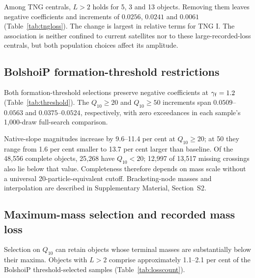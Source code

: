 \documentclass[11pt,a4paper]{article}
\begin{document}
Among TNG centrals, $L>2$ holds for 5, 3 and 13 objects. Removing them leaves negative coefficients and increments of $0.0256$, $0.0241$ and $0.0061$ (Table~\ref{tab:tngloss}). The change is largest in relative terms for TNG I. The association is neither confined to current satellites nor to these large-recorded-loss centrals, but both population choices affect its amplitude.
\begin{table}[htbp]\centering\small

\caption{Additional descriptive TNG central-only fits with $L\leq2$, at the fiducial parameter. Counts removed are relative to the central sample. No new permutation probabilities are assigned to these three populations. Control ranks remain $k_C=16,16,15$ for TNG I--III, excluding the history coefficient.}\label{tab:tngloss}
\end{table}

\subsection{BolshoiP formation-threshold restrictions}
Both formation-threshold selections preserve negative coefficients at $\gamma_{\rm f}=1.2$ (Table~\ref{tab:threshold}). The $Q_{10}\geq20$ and $Q_{10}\geq50$ increments span $0.0509$--$0.0563$ and $0.0375$--$0.0524$, respectively, with zero exceedances in each sample's 1,000-draw full-search comparison.

\begin{table}[htbp]\centering\small

\caption{BolshoiP threshold sensitivities at $\gamma_{\rm f}=1.2$. Errors are conventional OLS values; $b$ is the slope in catalogue units. Baseline and both cuts have zero of 1,000 joint-null exceedances. Each restricted null is generated on its own rows.}\label{tab:threshold}
\end{table}

Native-slope magnitudes increase by 9.6--11.4 per cent at $Q_{10}\geq20$; at 50 they range from 1.6 per cent smaller to 13.7 per cent larger than baseline. Of the 48,556 complete objects, 25,268 have $Q_{10}<20$; 12,997 of 13,517 missing crossings also lie below that value. Completeness therefore depends on mass scale without a universal 20-particle-equivalent cutoff. Bracketing-node masses and interpolation are described in Supplementary Material, Section~S2.

\subsection{Maximum-mass selection and recorded mass loss}\label{sec:loss}
Selection on $Q_{10}$ can retain objects whose terminal masses are substantially below their maxima. Objects with $L>2$ comprise approximately 1.1--2.1 per cent of the BolshoiP threshold-selected samples (Table~\ref{tab:losscount}).
\end{document}
